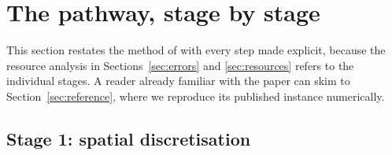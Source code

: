 \documentclass[11pt,a4paper]{article}
\theoremstyle{plain}
\theoremstyle{definition}
\theoremstyle{remark}
\begin{document}
\section{The pathway, stage by stage}
\label{sec:pathway}

This section restates the method of \cite{Setty2026} with every step made
explicit, because the resource analysis in Sections~\ref{sec:errors} and
\ref{sec:resources} refers to the individual stages.  A reader already familiar
with the paper can skim to Section~\ref{sec:reference}, where we reproduce its
published instance numerically.

\subsection{Stage 1: spatial discretisation}
\label{sec:space}
\end{document}
